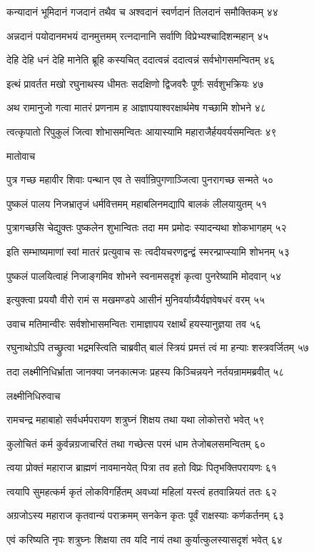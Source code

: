 कन्यादानं भूमिदानं गजदानं तथैव च
अश्वदानं स्वर्णदानं तिलदानं समौक्तिकम् ४४

अन्नदानं पयोदानमभयं दानमुत्तमम्
रत्नदानानि सर्वाणि विप्रेभ्यश्चादिशन्महान् ४५

देहि देहि धनं देहि मानेति ब्रूहि कस्यचित्
ददात्वन्नं ददात्वन्नं सर्वभोगसमन्वितम् ४६

इत्थं प्रावर्तत मखो रघुनाथस्य धीमतः
सदक्षिणो द्विजवरैः पूर्णः सर्वशुभक्रियः ४७

अथ रामानुजो गत्वा मातरं प्रणनाम ह
आज्ञापयाश्वरक्षार्थमेष गच्छामि शोभने ४८

त्वत्कृपातो रिपुकुलं जित्वा शोभासमन्वितः
आयास्यामि महाराजैर्हयवर्यसमन्वितः ४९

मातोवाच

पुत्र गच्छ महावीर शिवाः पन्थान एव ते
सर्वान्रिपुगणाञ्जित्वा पुनरागच्छ सन्मते ५०

पुष्कलं पालय निजभ्रातृजं धर्मवित्तमम्
महाबलिनमद्यापि बालकं लीलयायुतम् ५१

पुत्रागच्छसि चेद्युक्तः पुष्कलेन शुभान्वितः
तदा मम प्रमोदः स्यादन्यथा शोकभागहम् ५२

इति सम्भाष्यमाणां स्वां मातरं प्रत्युवाच सः
त्वदीयचरणद्वन्द्वं स्मरन्प्राप्स्यामि शोभनम् ५३

पुष्कलं पालयित्वाहं निजाङ्गमिव शोभने
स्वनामसदृशं कृत्वा पुनरेष्यामि मोदवान् ५४

इत्युक्त्वा प्रययौ वीरो रामं स मखमण्डपे
आसीनं मुनिवर्याग्र्यैर्यज्ञवेषधरं वरम् ५५

उवाच मतिमान्वीरः सर्वशोभासमन्वितः
रामाज्ञापय रक्षार्थं हयस्यानुज्ञया तव ५६

रघुनाथोऽपि तच्छ्रुत्वा भद्रमस्त्विति चाब्रवीत्
बालं स्त्रियं प्रमत्तं त्वं मा हन्याः शस्त्रवर्जितम् ५७

तदा लक्ष्मीनिधिर्भ्राता जानक्या जनकात्मजः
प्रहस्य किञ्चिन्नयने नर्तयन्राममब्रवीत् ५८

लक्ष्मीनिधिरुवाच

रामचन्द्र महाबाहो सर्वधर्मपरायण
शत्रुघ्नं शिक्षय तथा यथा लोकोत्तरो भवेत् ५९

कुलोचितं कर्म कुर्वन्नग्रजाचरितं तथा
गच्छेत्स परमं धाम तेजोबलसमन्वितम् ६०

त्वया प्रोक्तं महाराज ब्राह्मणं नावमानयेत्
पित्रा तव हतो विप्रः पितृभक्तिपरायणः ६१

त्वयापि सुमहत्कर्म कृतं लोकविगर्हितम्
अवध्यां महिलां यस्त्वं हतवान्नियतं ततः ६२

अग्रजोऽस्य महाराज कृतवान्यं पराक्रमम्
सनकेन कृतः पूर्वं राक्षस्याः कर्णकर्तनम् ६३

एवं करिष्यति नृपः शत्रुघ्नः शिक्षया तव
यदि नायं तथा कुर्यात्कुलस्यासदृशं भवेत् ६४

